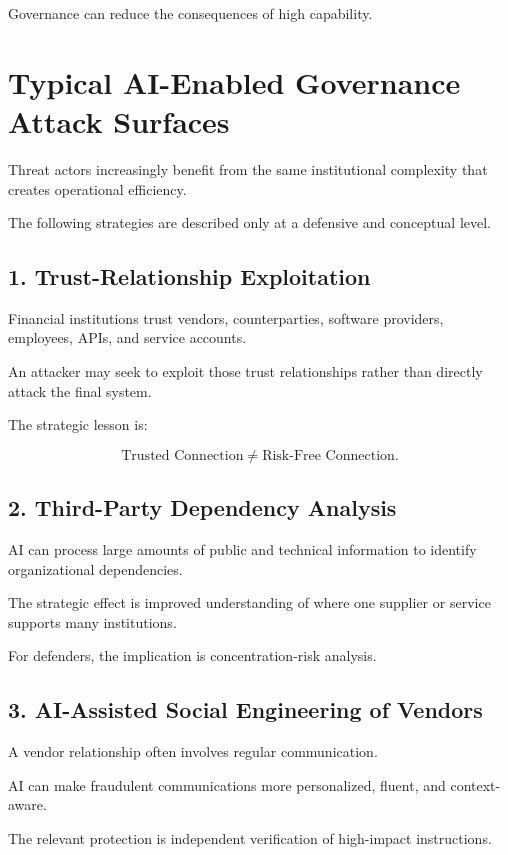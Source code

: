 Governance can reduce the consequences of high capability.

\section{Typical AI-Enabled Governance Attack Surfaces}

Threat actors increasingly benefit from the same institutional complexity that creates operational efficiency.

The following strategies are described only at a defensive and conceptual level.

\subsection{1. Trust-Relationship Exploitation}

Financial institutions trust vendors, counterparties, software providers, employees, APIs, and service accounts.

An attacker may seek to exploit those trust relationships rather than directly attack the final system.

The strategic lesson is:

\begin{equation}
\text{Trusted Connection}
\neq
\text{Risk-Free Connection}.
\end{equation}

\subsection{2. Third-Party Dependency Analysis}

AI can process large amounts of public and technical information to identify organizational dependencies.

The strategic effect is improved understanding of where one supplier or service supports many institutions.

For defenders, the implication is concentration-risk analysis.

\subsection{3. AI-Assisted Social Engineering of Vendors}

A vendor relationship often involves regular communication.

AI can make fraudulent communications more personalized, fluent, and context-aware.

The relevant protection is independent verification of high-impact instructions.

